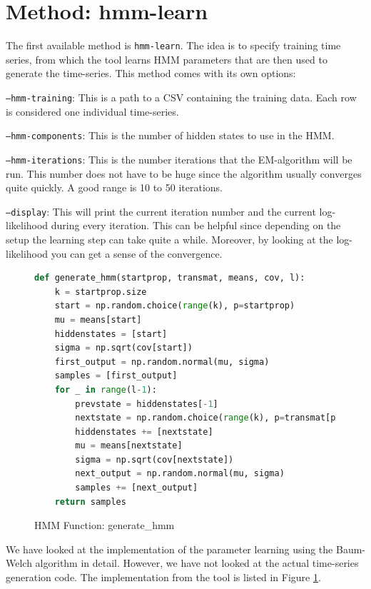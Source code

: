\section{Method: hmm-learn}

The first available method is \texttt{hmm-learn}. The idea is to specify training time series, from which the tool learns HMM parameters that are then used to generate the time-series. This method comes with its own options:

\texttt{---hmm-training}: This is a path to a CSV containing the training data. Each row is considered one individual time-series. 

\texttt{---hmm-components}: This is the number of hidden states to use in the HMM. 

\texttt{---hmm-iterations}: This is the number iterations that the EM-algorithm will be run. This number does not have to be huge since the algorithm usually converges quite quickly. A good range is 10 to 50 iterations.

\texttt{---display}: This will print the current iteration number and the current log-likelihood during every iteration. This can be helpful since depending on the setup the learning step can take quite a while. Moreover, by looking at the log-likelihood you can get a sense of the convergence. 

\begin{figure}
\begin{singlespace}
\begin{lstlisting}[language=Python]
def generate_hmm(startprop, transmat, means, cov, l):
    k = startprop.size
    start = np.random.choice(range(k), p=startprop)
    mu = means[start]
    hiddenstates = [start]
    sigma = np.sqrt(cov[start])
    first_output = np.random.normal(mu, sigma)
    samples = [first_output]
    for _ in range(l-1):
        prevstate = hiddenstates[-1]
        nextstate = np.random.choice(range(k), p=transmat[prevstate])
        hiddenstates += [nextstate]
        mu = means[nextstate]
        sigma = np.sqrt(cov[nextstate])
        next_output = np.random.normal(mu, sigma)
        samples += [next_output]
    return samples
\end{lstlisting}
\end{singlespace}
\caption{HMM Function: generate\_hmm}    
\label{fig:hmm-generate}
\end{figure}

We have looked at the implementation of the parameter learning using the Baum-Welch algorithm in detail. However, we have not looked at the actual time-series generation code. The implementation from the tool is listed in Figure \ref{fig:hmm-generate}. 

